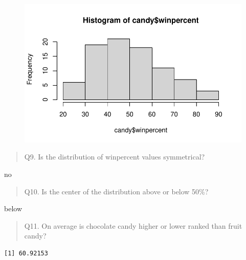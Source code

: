 \documentclass[
  letterpaper,
  DIV=11,
  numbers=noendperiod]{scrartcl}
\newenvironment{Shaded}{\begin{snugshade}}{\end{snugshade}}
\newcommand{\FunctionTok}[1]{\textcolor[rgb]{0.28,0.35,0.67}{#1}}
\newcommand{\NormalTok}[1]{\textcolor[rgb]{0.00,0.23,0.31}{#1}}
\newcommand{\SpecialCharTok}[1]{\textcolor[rgb]{0.37,0.37,0.37}{#1}}
\begin{document}
\begin{figure}[H]

{\centering \includegraphics{class09_files/figure-pdf/unnamed-chunk-10-1.pdf}

}

\end{figure}

\begin{quote}
Q9. Is the distribution of winpercent values symmetrical?
\end{quote}

no

\begin{quote}
Q10. Is the center of the distribution above or below 50\%?
\end{quote}

below

\begin{quote}
Q11. On average is chocolate candy higher or lower ranked than fruit
candy?
\end{quote}

\begin{Shaded}
\end{Shaded}

\begin{verbatim}
[1] 60.92153
\end{verbatim}

\begin{Shaded}
\end{Shaded}
\end{document}
